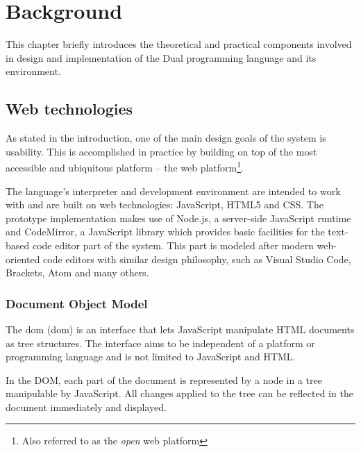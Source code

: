 \chapter{Background}\label{chap:background}
This chapter briefly introduces the theoretical and practical components
involved in design and implementation of the Dual programming language and its
environment. 

\section{Web technologies}
As stated in the introduction, one of the main design goals of the system is usability. This is accomplished in practice by building on top of the most accessible and ubiquitous platform -- the web platform\cite{web_platform}\footnote{Also referred to as the \textit{open} web platform\cite{open_web_platform}}.

The language's interpreter and development environment are intended to work with
and are built on web technologies: JavaScript, HTML5 and CSS. The prototype
implementation makes use of Node.js, a server-side JavaScript runtime\cite{nodejs_site} and
CodeMirror, a JavaScript library which provides basic facilities for the text-based code editor part of the system\cite{codemirror_site}. This part is modeled after modern web-oriented code editors with similar design philosophy\cite{js_text_editors_wikipedia}, such as Visual Studio Code\cite{vscode_site}, Brackets\cite{brackets_site}, Atom\cite{atom_site} and many others.

\subsection{Document Object Model}
The \acrlong{dom} (\acrshort{dom}) is an interface that lets JavaScript manipulate HTML documents as tree structures. The interface aims to be independent of a platform or programming language and is not limited to JavaScript and HTML\cite{dom_spec, w3_dom, dom_wikipedia}. 

In the DOM, each part of the document is represented by a node in a tree manipulable by JavaScript. All changes applied to the tree can be reflected in the document immediately and displayed.

